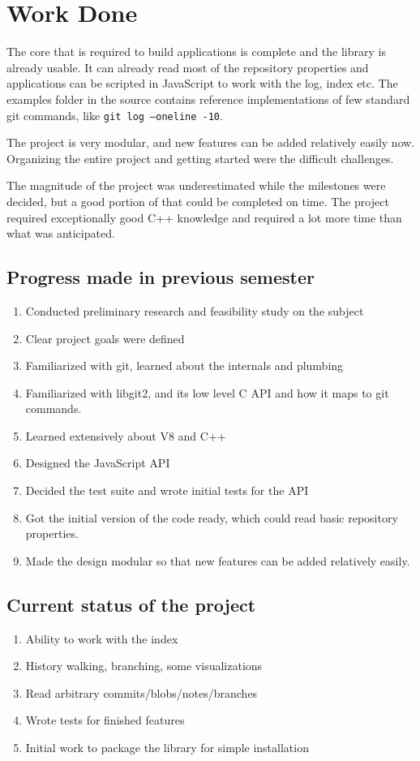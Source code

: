 \chapter{Work Done}

The core that is required to build applications is complete and the library is
already usable. It can already read most of the repository properties and
applications can be scripted in JavaScript to work with the log, index etc. The
examples folder in the source contains reference implementations of few standard
git commands, like \texttt{git log --oneline -10}.

The project is very modular, and new features can be added relatively easily
now. Organizing the entire project and getting started were the difficult
challenges.

The magnitude of the project was underestimated while the milestones were
decided, but a good portion of that could be completed on time. The project
required exceptionally good C++ knowledge and required a lot more time than what
was anticipated.

\section{Progress made in previous semester}
\begin{enumerate}
	\item Conducted preliminary research and feasibility study on the subject
	\item Clear project goals were defined
	\item Familiarized with git, learned about the internals and plumbing
    \item Familiarized with libgit2, and its low level C API and how it maps to
      git commands.
    \item Learned extensively about V8 and C++
    \item Designed the JavaScript API
    \item Decided the test suite and wrote initial tests for the API
    \item Got the initial version of the code ready, which could read basic
      repository properties.
    \item Made the design modular so that new features can be added relatively
      easily.
\end{enumerate}

\section{Current status of the project}
\begin{enumerate}
	\item Ability to work with the index
    \item History walking, branching, some visualizations
    \item Read arbitrary commits/blobs/notes/branches
    \item Wrote tests for finished features
    \item Initial work to package the library for simple installation
\end{enumerate}

